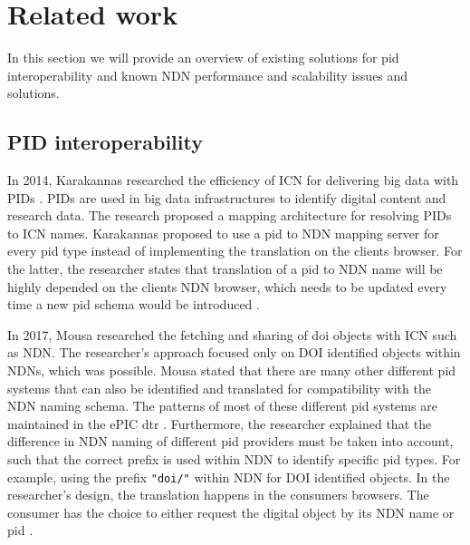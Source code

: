 \section{Related work}
\label{introduction-related-work}

In this section we will provide an overview of existing solutions for \gls{pid} interoperability and known NDN performance and scalability issues and solutions.

\subsection{PID interoperability}
\label{introduction-pid}
In 2014, Karakannas researched the efficiency of ICN for delivering big data with PIDs \cite{icn-bd}. PIDs are used in big data infrastructures to identify digital content and research data. The research proposed a mapping architecture for resolving PIDs to ICN names. Karakannas proposed to use a \gls{pid} to NDN mapping server for every \gls{pid} type instead of implementing the translation on the clients browser. For the latter, the researcher states that translation of a \gls{pid} to NDN name will be highly depended on the clients NDN browser, which needs to be updated every time a new \gls{pid} schema would be introduced \cite{icn-bd}.

In 2017, Mousa researched the fetching and sharing of \gls{doi} objects with ICN such as NDN. 
The researcher's approach focused only on DOI identified objects within NDNs, which was possible. Mousa stated that there are many other different \gls{pid} systems that can also be identified and translated for compatibility with the NDN naming schema. The patterns of most of these different \gls{pid} systems are maintained in the ePIC \gls{dtr} \cite{dtr}.
 Furthermore, the researcher explained that the difference in NDN naming of different \gls{pid} providers must be taken into account, such that the correct prefix is used within NDN to identify specific \gls{pid} types. For example, using the prefix \texttt{"doi/"} within NDN for DOI identified objects.
In the researcher's design, the translation happens in the consumers browsers. The consumer has the choice to either request the digital object by its NDN name or \gls{pid} \cite{ndn-app-aware}.


